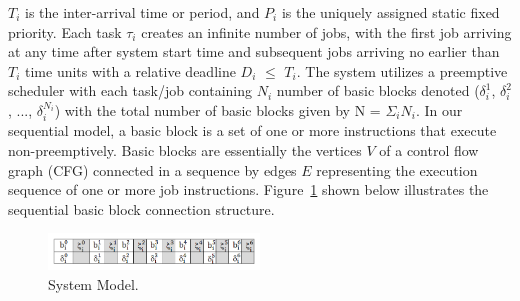 \begin{math}T_{i}\end{math} is the inter-arrival time or period, and \begin{math}P_{i}\end{math} is
the uniquely assigned static fixed priority.  Each task \begin{math}\tau_{i}\end{math} creates an infinite number of jobs, with the first job arriving at any time after system start time and subsequent jobs arriving no earlier than \begin{math}T_{i}\end{math} time units with a relative deadline \begin{math}D_{i}\end{math} \begin{math}\leq\end{math} \begin{math}T_{i}\end{math}.  The system utilizes a preemptive scheduler with each task/job containing \begin{math}N_{i}\end{math} number of basic blocks denoted (\begin{math}\delta_{i}^{1}\end{math}, \begin{math}\delta_{i}^{2}\end{math}, ..., \begin{math}\delta_{i}^{N_{i}}\end{math}) with the total number of basic blocks given by N = \begin{math}\Sigma_{i}\end{math}\begin{math}N_{i}\end{math}. In our sequential model, a basic block is a set of one or more instructions that execute non-preemptively.  Basic blocks are essentially the vertices $V$ of a control flow graph (CFG) connected in a sequence by edges $E$ representing the execution sequence of one or more job instructions. Figure~\ref{fig:system_model} shown below illustrates the sequential basic block connection structure.
\vspace{-5pt}
\begin{figure}[h!]
\begin{center}
\includegraphics[width=0.5\textwidth]{system_model.png}
\caption{System Model.}
\label{fig:system_model}
\end{center}
\vspace{-10pt}
\end{figure}
